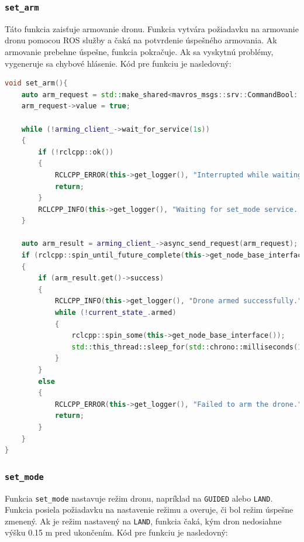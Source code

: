 \subsubsection{\texttt{set\_arm}}
Táto funkcia zaisťuje armovanie dronu. Funkcia vytvára požiadavku na armovanie dronu pomocou ROS služby a čaká na potvrdenie úspešného armovania. Ak armovanie prebehne úspešne, funkcia pokračuje. Ak sa vyskytnú problémy, vygeneruje sa chybové hlásenie. Kód pre funkciu je nasledovný:

\begin{lstlisting}[language=C++, caption={Funkcia pre armovanie dronu}]
void set_arm(){
    auto arm_request = std::make_shared<mavros_msgs::srv::CommandBool::Request>();
    arm_request->value = true;

    while (!arming_client_->wait_for_service(1s))
    {
        if (!rclcpp::ok())
        {
            RCLCPP_ERROR(this->get_logger(), "Interrupted while waiting for the set_mode service. Exiting.");
            return;
        }
        RCLCPP_INFO(this->get_logger(), "Waiting for set_mode service...");
    }

    auto arm_result = arming_client_->async_send_request(arm_request);
    if (rclcpp::spin_until_future_complete(this->get_node_base_interface(), arm_result) == rclcpp::FutureReturnCode::SUCCESS)
    {
        if (arm_result.get()->success)
        {
            RCLCPP_INFO(this->get_logger(), "Drone armed successfully.");
            while (!current_state_.armed)
            {
                rclcpp::spin_some(this->get_node_base_interface());
                std::this_thread::sleep_for(std::chrono::milliseconds(100));
            }
        }
        else
        {
            RCLCPP_ERROR(this->get_logger(), "Failed to arm the drone.");
            return;
        }
    }
}
\end{lstlisting}

\subsubsection{\texttt{set\_mode}}
Funkcia \texttt{set\_mode} nastavuje režim dronu, napríklad na \texttt{GUIDED} alebo \texttt{LAND}. Funkcia posiela požiadavku na nastavenie režimu a overuje, či bol režim úspešne zmenený. Ak je režim nastavený na \texttt{LAND}, funkcia čaká, kým dron nedosiahne výšku 0.15 m pred ukončením. Kód pre funkciu je nasledovný:

